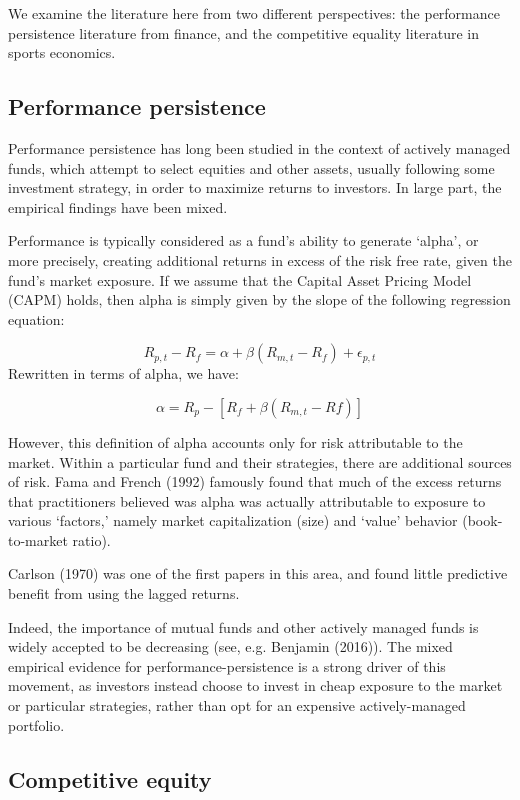 \documentclass[11pt,]{scrartcl}
\begin{document}
We examine the literature here from two different perspectives: the
performance persistence literature from finance, and the competitive
equality literature in sports economics.

\subsection{Performance persistence}\label{performance-persistence}

Performance persistence has long been studied in the context of actively
managed funds, which attempt to select equities and other assets,
usually following some investment strategy, in order to maximize returns
to investors. In large part, the empirical findings have been mixed.

Performance is typically considered as a fund's ability to generate
`alpha', or more precisely, creating additional returns in excess of the
risk free rate, given the fund's market exposure. If we assume that the
Capital Asset Pricing Model (CAPM) holds, then alpha is simply given by
the slope of the following regression equation:

\[R_{p, t} - R_{f} = \alpha + \beta(R_{m,t} - R_f) + \epsilon_{p,t}\]
Rewritten in terms of alpha, we have:

\[\alpha = R_p - [R_f + \beta(R_{m,t} - Rf)]\]

However, this definition of alpha accounts only for risk attributable to
the market. Within a particular fund and their strategies, there are
additional sources of risk. Fama and French (1992) famously found that
much of the excess returns that practitioners believed was alpha was
actually attributable to exposure to various `factors,' namely market
capitalization (size) and `value' behavior (book-to-market ratio).

Carlson (1970) was one of the first papers in this area, and found
little predictive benefit from using the lagged returns.

Indeed, the importance of mutual funds and other actively managed funds
is widely accepted to be decreasing (see, e.g. Benjamin (2016)). The
mixed empirical evidence for performance-persistence is a strong driver
of this movement, as investors instead choose to invest in cheap
exposure to the market or particular strategies, rather than opt for an
expensive actively-managed portfolio.

\subsection{Competitive equity}\label{competitive-equity}
\end{document}
